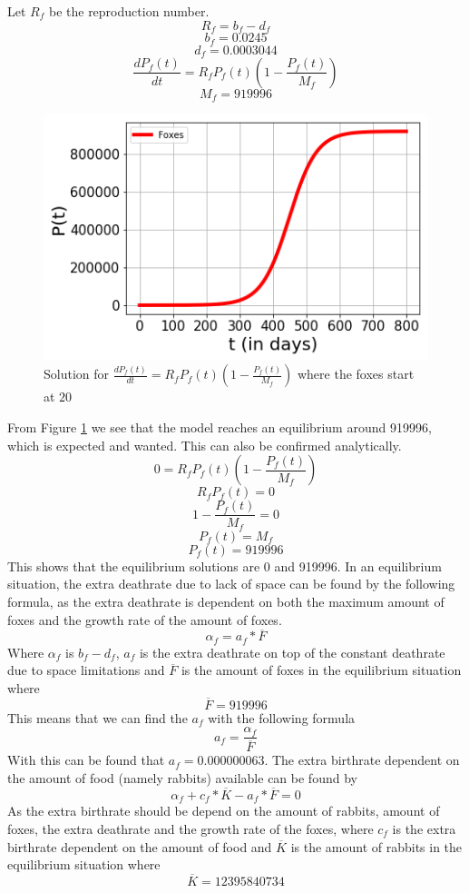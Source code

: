 \documentclass{article}
\begin{document}
Let $R_f$ be the reproduction number.
$$R_f = b_f - d_f$$
$$b_f = 0.0245$$
$$d_f = 0.0003044$$
$$\frac{dP_f(t)}{dt} = R_fP_f(t)(1-\frac{P_f(t)}{M_f})$$
$$M_f = 919996$$
\begin{figure}[h!]
    \centering
    \includegraphics[scale=0.78]{Pictures/Foxes.png}
    \caption{Solution for $\frac{dP_f(t)}{dt} = R_fP_f(t)(1-\frac{P_f(t)}{M_f})$ where the foxes start at $20$}
    \label{fig:Foxes}
\end{figure}
From Figure \ref{fig:Foxes} we see that the model reaches an equilibrium around 919996, which is expected and wanted. This can also be confirmed analytically.
$$0=R_fP_f(t)(1-\frac{P_f(t)}{M_f})$$
$$R_fP_f(t)=0$$
$$1-\frac{P_f(t)}{M_f}=0$$
$$P_f(t)=M_f$$
$$P_f(t)=919996$$
This shows that the equilibrium solutions are 0 and 919996. In an equilibrium situation, the extra deathrate due to lack of space can be found by the following formula, as the extra deathrate is dependent on both the maximum amount of foxes and the growth rate of the amount of foxes.
$$\alpha_f = a_f * \overline{F}$$
Where $\alpha_f$ is $b_f-d_f$, $a_f$ is the extra deathrate on top of the constant deathrate due to space limitations and $\overline{F}$ is the amount of foxes in the equilibrium situation where
$$\overline{F} = 919996$$
This means that we can find the $a_f$ with the following formula
$$a_f = \frac{\alpha_f}{\overline{F}}$$
With this can be found that $a_f = 0.000000063$. The extra birthrate dependent on the amount of food (namely rabbits) available can be found by
$$\alpha_f + c_f*\overline{K}-a_f*\overline{F}=0$$
As the extra birthrate should be depend on the amount of rabbits, amount of foxes, the extra deathrate and the growth rate of the foxes, where $c_f$ is the extra birthrate dependent on the amount of food and $\overline{K}$ is the amount of rabbits in the equilibrium situation where
$$\overline{K}=12395840734$$
\end{document}
